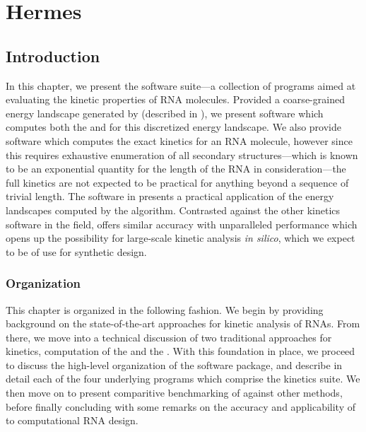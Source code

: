 
\chapter{Hermes}
\label{ch:hermes}


\section{Introduction}
\label{sec:hermes:intro}

In this chapter, we present the \hermes software suite---a collection of
programs aimed at evaluating the kinetic properties of RNA molecules.
Provided a coarse-grained energy landscape generated by \ffttwo (described
in ), we present software which computes both the \mfpt
and \eqt for this discretized energy landscape. We also provide software which
computes the exact kinetics for an RNA molecule, however since this requires
exhaustive enumeration of all secondary structures---which is known to be an
exponential quantity for the length of the RNA in consideration---the full
kinetics are not expected to be practical for anything beyond a sequence of
trivial length. The software in \hermes presents a practical application of
the energy landscapes computed by the \ffttwo algorithm. Contrasted against
the other kinetics software in the field, \hermes offers similar accuracy
with unparalleled performance which opens up the possibility for large-scale
kinetic analysis {\em in silico}, which we expect to be of use for synthetic
design.

\subsection{Organization}
\label{subsec:hermes:org}

This chapter is organized in the following fashion. We begin by providing
background on the state-of-the-art approaches for kinetic analysis of RNAs.
From there, we move into a technical discussion of two traditional approaches
for kinetics, computation of the \mfpt and the \eqt. With this foundation in
place, we proceed to discuss the high-level organization of the \hermes
software package, and describe in detail each of the four underlying programs
which comprise the kinetics suite. We then move on to present comparitive
benchmarking of \hermes against other methods, before finally concluding with
some remarks on the accuracy and applicability of \hermes to computational
RNA design.

